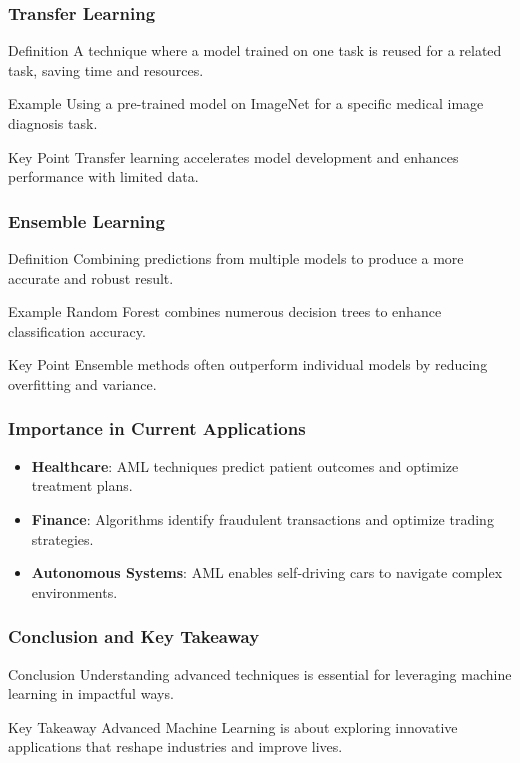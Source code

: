 \documentclass[aspectratio=169]{beamer}
\begin{document}
\begin{frame}[fragile]
    \frametitle{Transfer Learning}
    \begin{block}{Definition}
        A technique where a model trained on one task is reused for a related task, saving time and resources.
    \end{block}
    \begin{exampleblock}{Example}
        Using a pre-trained model on ImageNet for a specific medical image diagnosis task.
    \end{exampleblock}
    \begin{block}{Key Point}
        Transfer learning accelerates model development and enhances performance with limited data.
    \end{block}
\end{frame}

\begin{frame}[fragile]
    \frametitle{Ensemble Learning}
    \begin{block}{Definition}
        Combining predictions from multiple models to produce a more accurate and robust result.
    \end{block}
    \begin{exampleblock}{Example}
        Random Forest combines numerous decision trees to enhance classification accuracy.
    \end{exampleblock}
    \begin{block}{Key Point}
        Ensemble methods often outperform individual models by reducing overfitting and variance.
    \end{block}
\end{frame}

\begin{frame}[fragile]
    \frametitle{Importance in Current Applications}
    \begin{itemize}
        \item \textbf{Healthcare}: AML techniques predict patient outcomes and optimize treatment plans.
        \item \textbf{Finance}: Algorithms identify fraudulent transactions and optimize trading strategies.
        \item \textbf{Autonomous Systems}: AML enables self-driving cars to navigate complex environments.
    \end{itemize}
\end{frame}

\begin{frame}[fragile]
    \frametitle{Conclusion and Key Takeaway}
    \begin{block}{Conclusion}
        Understanding advanced techniques is essential for leveraging machine learning in impactful ways.
    \end{block}
    \begin{block}{Key Takeaway}
        Advanced Machine Learning is about exploring innovative applications that reshape industries and improve lives.
    \end{block}
\end{frame}
\end{document}
